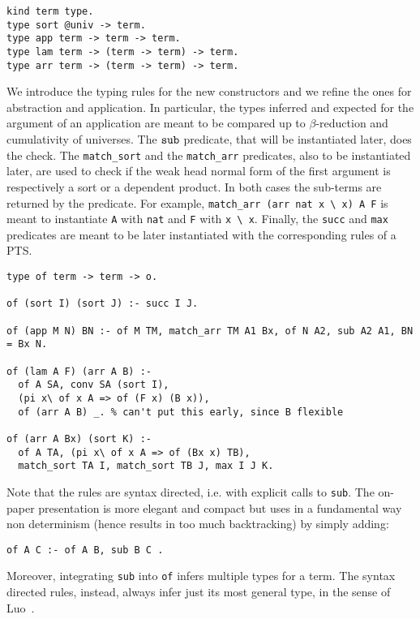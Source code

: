 \documentclass{easychair}
\begin{document}
\begin{verbatim}
kind term type.
type sort @univ -> term.
type app term -> term -> term.
type lam term -> (term -> term) -> term.
type arr term -> (term -> term) -> term.
\end{verbatim}

We introduce the typing rules for the new constructors and we refine the
ones for abstraction and application. In particular, the types inferred and
expected for the argument of an application are meant to be compared up to $\beta$-reduction and cumulativity of universes. The $\verb+sub+$ predicate, that will be instantiated later, does the check. The \verb+match_sort+ and the \verb+match_arr+ predicates, also to be instantiated later, are used to check if the weak head normal form of the first argument is respectively a sort or a dependent product. In both cases the sub-terms are returned by the predicate. For example, \verb+match_arr (arr nat x \ x) A F+ is meant to instantiate \verb+A+ with \verb+nat+ and \verb+F+ with \verb+x \ x+. Finally, the \verb+succ+ and \verb+max+ predicates are meant to be later instantiated with the corresponding rules of a PTS.

\begin{verbatim}
type of term -> term -> o.

of (sort I) (sort J) :- succ I J.

of (app M N) BN :- of M TM, match_arr TM A1 Bx, of N A2, sub A2 A1, BN = Bx N.

of (lam A F) (arr A B) :-
  of A SA, conv SA (sort I),
  (pi x\ of x A => of (F x) (B x)),
  of (arr A B) _. % can't put this early, since B flexible

of (arr A Bx) (sort K) :-
  of A TA, (pi x\ of x A => of (Bx x) TB),
  match_sort TA I, match_sort TB J, max I J K.
\end{verbatim}

Note that the rules are syntax directed, i.e. with explicit calls to
\verb+sub+.  The on-paper presentation is more elegant and compact but 
uses in a fundamental way non determinism (hence results in too much
backtracking) by simply adding:

\begin{verbatim}
of A C :- of A B, sub B C .
\end{verbatim}

Moreover, integrating \verb+sub+ into \verb+of+ infers multiple types for a term. The syntax directed rules, instead, always infer just its most general type, in the sense of Luo~\cite{luo2}.
\end{document}
